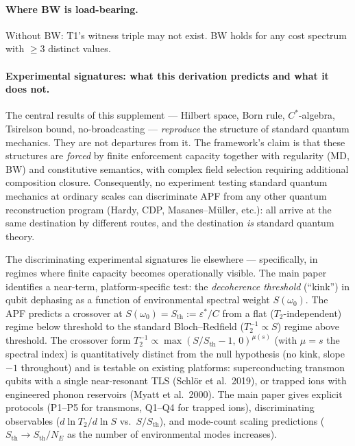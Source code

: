\documentclass[11pt,a4paper]{article}
\theoremstyle{definition}
\newcommand{\eps}{\varepsilon}
\begin{document}
\paragraph{Where BW is load-bearing.}  Without BW: T1's witness triple may not exist.  BW holds for any cost spectrum with $\ge 3$ distinct values.

\paragraph{Experimental signatures: what this derivation predicts and what it does not.}
The central results of this supplement --- Hilbert space, Born rule, $C^*$-algebra, Tsirelson bound, no-broadcasting --- \emph{reproduce} the structure of standard quantum mechanics.  They are not departures from it.  The framework's claim is that these structures are \emph{forced} by finite enforcement capacity together with regularity (MD, BW) and constitutive semantics, with complex field selection requiring additional composition closure.  Consequently, no experiment testing standard quantum mechanics at ordinary scales can discriminate APF from any other quantum reconstruction program (Hardy, CDP, Masanes--M\"uller, etc.): all arrive at the same destination by different routes, and the destination \emph{is} standard quantum theory.

The discriminating experimental signatures lie elsewhere --- specifically, in regimes where finite capacity becomes operationally visible.  The main paper identifies a near-term, platform-specific test: the \emph{decoherence threshold} (``kink'') in qubit dephasing as a function of environmental spectral weight $S(\omega_0)$.  The APF predicts a crossover at $S(\omega_0) = S_{\mathrm{th}} := \eps^*/C$ from a flat ($T_2$-independent) regime below threshold to the standard Bloch--Redfield ($T_2^{-1} \propto S$) regime above threshold.  The crossover form $T_2^{-1} \propto \max(S/S_{\mathrm{th}} - 1,\, 0)^{\mu(s)}$ (with $\mu = s$ the spectral index) is quantitatively distinct from the null hypothesis (no kink, slope $-1$ throughout) and is testable on existing platforms: superconducting transmon qubits with a single near-resonant TLS (Schl\"or et al.\ 2019), or trapped ions with engineered phonon reservoirs (Myatt et al.\ 2000).  The main paper gives explicit protocols (P1--P5 for transmons, Q1--Q4 for trapped ions), discriminating observables ($d\ln T_2 / d\ln S$ vs.\ $S/S_{\mathrm{th}}$), and mode-count scaling predictions ($S_{\mathrm{th}} \to S_{\mathrm{th}}/N_E$ as the number of environmental modes increases).
\end{document}

